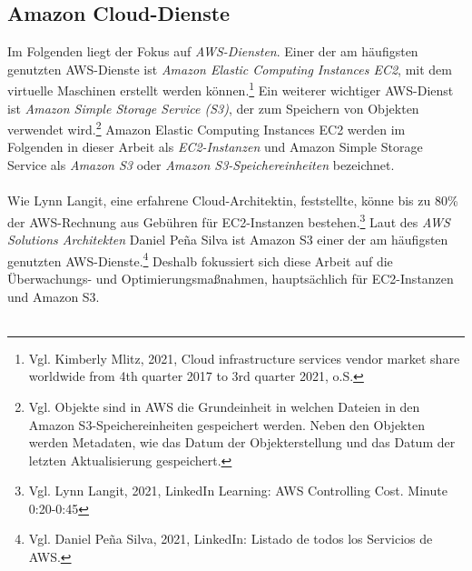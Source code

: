 \subsection{Amazon Cloud-Dienste}%
Im Folgenden liegt der Fokus auf \textit{AWS-Diensten}. Einer der am häufigsten genutzten AWS-Dienste ist \textit{Amazon Elastic Computing Instances EC2}, mit dem virtuelle Maschinen erstellt werden können.\footnote{Vgl.  Kimberly Mlitz, 2021, Cloud infrastructure services vendor market share worldwide from 4th quarter 2017 to 3rd quarter 2021, o.S.\cite{STA4}} Ein weiterer wichtiger AWS-Dienst ist \textit{Amazon Simple Storage Service (S3)}, der zum Speichern von Objekten verwendet wird.\footnote{Vgl. Objekte sind in AWS die Grundeinheit in welchen Dateien in den Amazon S3-Speichereinheiten gespeichert werden. Neben den Objekten werden Metadaten, wie das Datum der Objekterstellung und das Datum der letzten Aktualisierung gespeichert.} Amazon Elastic Computing Instances EC2 werden im Folgenden in dieser Arbeit als \textit{EC2-Instanzen} und Amazon Simple Storage Service als \textit{Amazon S3} oder \textit{Amazon S3-Speichereinheiten} bezeichnet.
\\\\
Wie Lynn Langit, eine erfahrene Cloud-Architektin, feststellte, könne bis zu 80\% der AWS-Rechnung aus Gebühren für EC2-Instanzen bestehen.\footnote{Vgl. Lynn Langit, 2021, LinkedIn Learning: AWS Controlling Cost. Minute 0:20-0:45\cite{LINK2}} Laut des \textit{AWS Solutions Architekten} Daniel Peña Silva ist Amazon S3 einer der am häufigsten genutzten AWS-Dienste.\footnote{Vgl. Daniel Peña Silva, 2021, LinkedIn: Listado de todos los Servicios de AWS.\cite{LINK1}} Deshalb fokussiert sich diese Arbeit auf die Überwachungs- und Optimierungsmaßnahmen, hauptsächlich für EC2-Instanzen und Amazon S3.  %
\\\\
